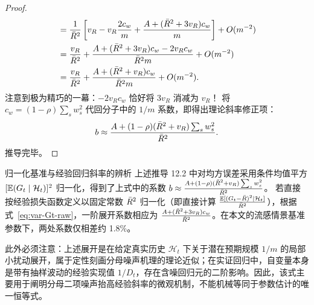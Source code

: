 \begin{proof}
\begin{align}
  &= \frac{1}{\bar{R}^2} \left[ v_R - v_R \frac{2c_w}{m} + \frac{A + (\bar{R}^2 + 3v_R)c_w}{m} \right] + O(m^{-2}) \nonumber \\
  &= \frac{v_R}{\bar{R}^2} + \frac{A + (\bar{R}^2 + 3v_R)c_w - 2v_R c_w}{\bar{R}^2 m} + O(m^{-2}) \nonumber \\
  &= \frac{v_R}{\bar{R}^2} + \frac{A + (\bar{R}^2 + v_R)c_w}{\bar{R}^2 m} + O(m^{-2}).
\end{align}
注意到极为精巧的一幕：$-2v_R c_w$ 恰好将 $3v_R$ 消减为 $v_R$！
将 $c_w = (1 - \rho)\sum_s w_s^2$ 代回分子中的 $1/m$ 系数，即得出理论斜率修正项：
\begin{equation}
  b \approx \frac{A + (1 - \rho)(\bar{R}^2 + v_R)\sum_s w_s^2}{\bar{R}^2}.
\end{equation}
推导完毕。
\end{proof}

\begin{insightbox}{归一化基准与经验回归斜率的辨析}
上述推导 12.2 中对均方误差采用条件均值平方 $[\mathbb{E}(G_t \mid \mathcal{H}_t)]^2$ 归一化，得到了上式中的系数 $b \approx \frac{A + (1-\rho)(\bar{R}^2+v_R)\sum_s w_s^2}{\bar{R}^2}$。
若直接按经验损失函数定义以固定常数 $\bar{R}^2$ 归一化（即直接计算 $\frac{\mathbb{E}[(G_t - \bar{R})^2 \mid \mathcal{H}_t]}{\bar{R}^2}$），根据式~\eqref{eq:var-Gt-raw}，一阶展开系数相应为 $\frac{A + (\bar{R}^2 + 3v_R)c_w}{\bar{R}^2}$。在本文的流感情景基准参数下，两处系数仅相差约 1.8\%。

此外必须注意：上述展开是在给定真实历史 $\mathcal{H}_t$ 下关于潜在预期规模 $1/m$ 的局部小扰动展开，属于定性刻画分母噪声机理的理论近似；在实证回归中，自变量本身是带有抽样波动的经验实现值 $1/D_t$，存在含噪回归元的二阶影响。因此，该式主要用于阐明分母二项噪声抬高经验斜率的微观机制，不能机械等同于参数估计的唯一恒等式。
\end{insightbox}
